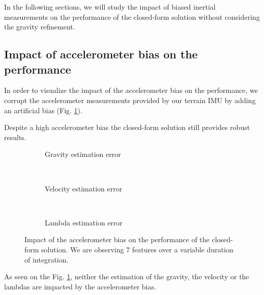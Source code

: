 \documentclass[letterpaper, 10 pt, conference]{ieeeconf}  %
\begin{document}
In the following sections, we will study the impact of biased inertial measurements on the performance of the closed-form solution without considering the gravity refinement.

\subsection{Impact of accelerometer bias on the performance}
In order to visualize the impact of the accelerometer bias on the performance,
we corrupt the accelerometer measurements provided by our terrain IMU by adding an artificial bias (Fig. \ref{fig:biasAccCF}).

Despite a high accelerometer bias the closed-form solution still provides robust results.

\begin{figure}
        \centering

        \begin{subfigure}[b]{0.5\columnwidth}
                \resizebox{\columnwidth}{!}{}
                \caption{Gravity estimation error}

        \end{subfigure}%
        ~ %
        \begin{subfigure}[b]{0.5\columnwidth}
                \resizebox{\columnwidth}{!}{}
                \caption{Velocity estimation error}

        \end{subfigure}
        ~ %
        \begin{subfigure}[b]{0.5\columnwidth}
                \resizebox{\columnwidth}{!}{}
                \caption{Lambda estimation error}

        \end{subfigure}
        \caption{Impact of the accelerometer bias on the performance of the closed-form solution. We are observing 7 features  over a variable duration of integration.\label{fig:biasAccCF}}
\end{figure}

As seen on the Fig. \ref{fig:biasAccCF}, neither the estimation of the gravity, the velocity or the lambdas are impacted by the accelerometer bias.
\end{document}
